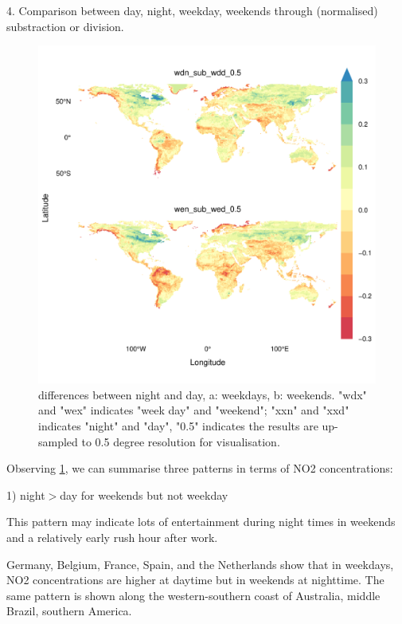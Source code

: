 \documentclass{article}
\begin{document}
4. Comparison between day, night, weekday, weekends through (normalised) substraction or division.

\begin{figure}
    \centering
    \includegraphics[scale=0.7]{fig/wen_sub_wed_0.5.pdf}
    \caption{differences between night and day, a: weekdays, b: weekends. "wdx" and "wex" indicates "week day" and "weekend"; "xxn" and "xxd" indicates "night" and "day", "0.5" indicates the results are up-sampled to 0.5 degree resolution for visualisation. }
    \label{fig:subdn}
\end{figure}

Observing \cref{fig:subdn}, we can summarise three patterns in terms of NO2 concentrations:

1) night$>$day for weekends but not weekday

This pattern may indicate lots of entertainment during night times in weekends and a relatively early rush hour after work.

Germany, Belgium, France, Spain, and the Netherlands show that in weekdays, NO2 concentrations are higher at daytime but in weekends at nighttime. The same pattern is shown along the western-southern coast of Australia, middle Brazil, southern America. 
\end{document}

